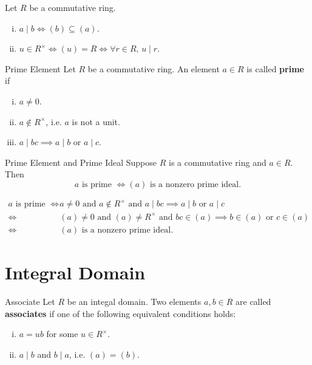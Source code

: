 \begin{proposition}{}{}
    Let $R$ be a commutative ring.
    \begin{enumerate}[(i)]
        \item $a \mid b\iff(b) \subseteq (a)$.
        \item $u\in R^\times \iff (u) = R  \iff \forall r\in R,\,u\mid r$.
    \end{enumerate}
\end{proposition}

\begin{definition}{Prime Element}{}
    Let $R$ be a commutative ring. An element $a\in R$ is called \textbf{prime} if
    \begin{enumerate}[(i)]
        \item $a\ne 0$.
        \item $a\notin R^\times$, i.e. $a$ is not a unit.
        \item $a\mid bc\implies a\mid b\text{ or }a\mid c$.
    \end{enumerate}
\end{definition}



\begin{proposition}{Prime Element and Prime Ideal}{}
    Suppose $R$ is a commutative ring and $a\in R$. Then
    \[
        a\text{ is prime }\iff (a)\text{ is a nonzero prime ideal}.
    \]
\end{proposition}

\begin{prf}
    \begin{align*}
        a\text{ is prime }\iff &a\ne 0\text{ and }a\notin R^\times\text{ and }a\mid bc\implies a\mid b\text{ or }a\mid c\\
        \iff &(a)\ne 0\text{ and }(a)\ne R^\times\text{ and }bc\in (a)\implies b\in (a)\text{ or }c\in (a)\\
        \iff &(a)\text{ is a nonzero prime ideal}.
    \end{align*}
\end{prf}



\section{Integral Domain}

\begin{definition}{Associate}{}
    Let $R$ be an integal domain. Two elements $a,b\in R$ are called \textbf{associates} if one of the following equivalent conditions holds:
    \begin{enumerate}[(i)]
        \item $a=ub$ for some $u\in R^\times$.
        \item $a\mid b$ and $b\mid a$, i.e. $(a)=(b)$.
    \end{enumerate}
\end{definition}

